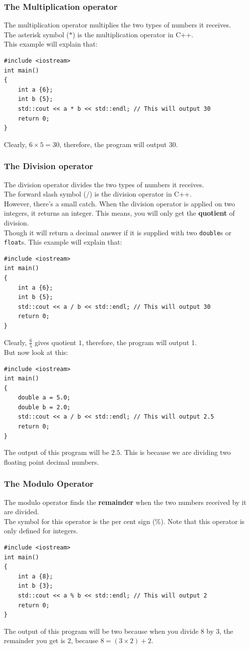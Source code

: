 \documentclass[letterpaper, 12pt]{book}
\begin{document}
\subsubsection{The Multiplication operator}
The multiplication operator multiplies the two types of numbers it receives.\\
The asterisk symbol ($*$) is the multiplication operator in C++.\\
This example will explain that:
\begin{lstlisting}
#include <iostream>
int main()
{
	int a {6};
	int b {5};
	std::cout << a * b << std::endl; // This will output 30
	return 0;
}
\end{lstlisting}
Clearly, $6 \times 5 = 30$, therefore, the program will output 30.
\subsubsection{The Division operator}
The division operator divides the two types of numbers it receives.\\
The forward slash symbol ($/$) is the division operator in C++.\\
However, there's a small catch. When the division operator is applied on two integers, it returns an integer. This means, you will only get the \textbf{quotient} of division.\\
Though it will return a decimal answer if it is supplied with two \lstinline{double}s or \lstinline{float}s.
This example will explain that:
\begin{lstlisting}
#include <iostream>
int main()
{
	int a {6};
	int b {5};
	std::cout << a / b << std::endl; // This will output 30
	return 0;
}
\end{lstlisting}
Clearly, $\frac{6}{5}$ gives quotient $1$, therefore, the program will output 1.\\
But now look at this:
\begin{lstlisting}
#include <iostream>
int main()
{
	double a = 5.0;
	double b = 2.0;
	std::cout << a / b << std::endl; // This will output 2.5
	return 0;
}
\end{lstlisting}
The output of this program will be $2.5$. This is because we are dividing two floating point decimal numbers.
\subsubsection{The Modulo Operator}
The modulo operator finds the \textbf{remainder} when the two numbers received by it are divided.\\
The symbol for this operator is the per cent sign (\%). Note that this operator is only defined for integers.
\begin{lstlisting}
#include <iostream>
int main()
{
	int a {8};
	int b {3};
	std::cout << a % b << std::endl; // This will output 2
	return 0;
}
\end{lstlisting}
The output of this program will be two because when you divide 8 by 3, the remainder you get is 2, because $8 = (3 \times 2) + 2$.
\end{document}
